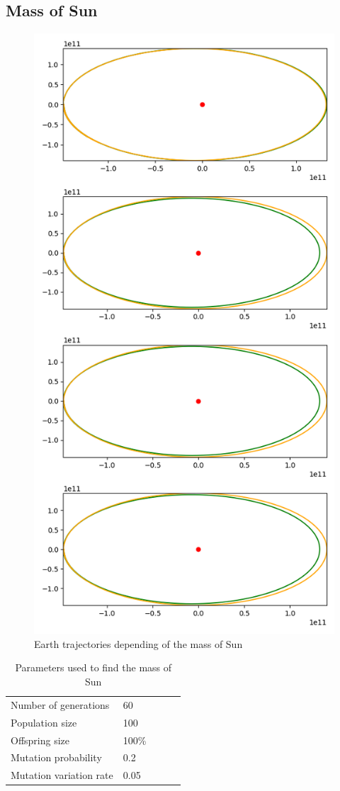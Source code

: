 \subsection{Mass of Sun}
\begin{figure}
    \center
    \includegraphics[width=0.5\linewidth,scale=.3]{img/sun_mass.png}
    \caption{Earth trajectories depending of the mass of Sun}
\end{figure}

\begin{table}[H]
    \begin{tabular}{lllll}
    Number of generations & 60 \\
    Population size & 100 \\
    Offspring size & 100\% \\
    Mutation probability & 0.2 \\
    Mutation variation rate & 0.05
    \end{tabular}
    \caption{Parameters used to find the mass of Sun}
\end{table}

